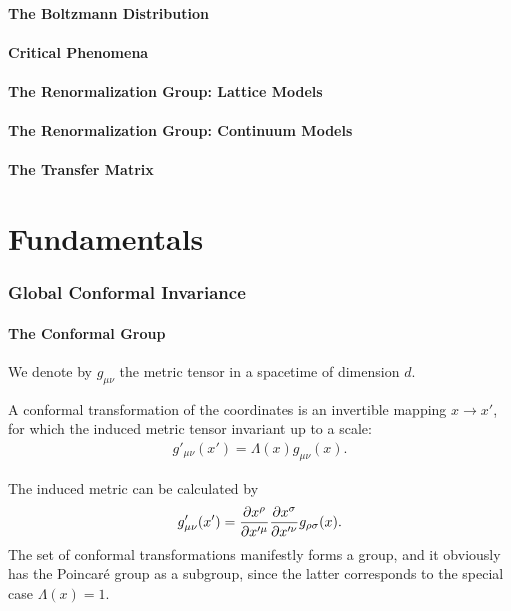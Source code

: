 \documentclass[10pt]{article}
\begin{document}
\subsection{The Boltzmann Distribution}
\subsection{Critical Phenomena}
\subsection{The Renormalization Group: Lattice Models}
\subsection{The Renormalization Group: Continuum Models}
\subsection{The Transfer Matrix}
\clearpage
\part{Fundamentals}
\section{Global Conformal Invariance}
\subsection{The Conformal Group}
We denote by $g_{\mu\nu}$ the metric tensor in a spacetime of dimension $d$.
\begin{definition}
    A conformal transformation of the coordinates is an invertible mapping $x\to x'$, for which the induced metric tensor invariant up to a scale:
    \begin{align}
        g'_{\mu\nu}(x')=\Lambda(x)g_{\mu\nu}(x).\label{eq:ct:conformal_transformation}
    \end{align}
\end{definition}
The induced metric can be calculated by
\begin{align}
    g'_{\mu\nu}(x')=\pdv{x^\rho}{x'^\mu}\pdv{x^\sigma}{x'^\nu}g_{\rho\sigma}(x).\label{eq:ct:induced_metric}
\end{align}
The set of conformal transformations manifestly forms a group, and it obviously has the Poincar\'{e} group as a subgroup, since the latter corresponds to the special case $\Lambda(x)=1$.
\end{document}
